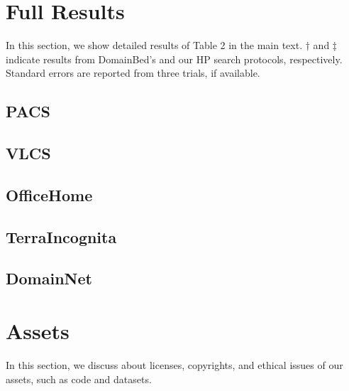 \section{Full Results}

In this section, we show detailed results of Table 2 in the main text.
$\dagger$ and $\ddagger$ indicate results from DomainBed's and our HP search protocols, respectively. Standard errors are reported from three trials, if available.


\subsection{PACS}


\subsection{VLCS}


\subsection{OfficeHome}


\subsection{TerraIncognita}


\subsection{DomainNet}


\section{Assets}

In this section, we discuss about licenses, copyrights, and ethical issues of our assets, such as code and datasets. 

